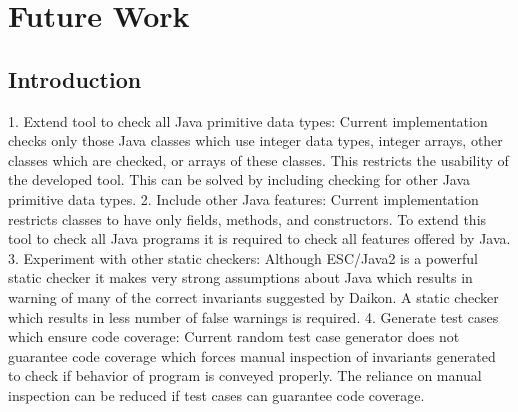 
\chapter{Future Work}
\label{chap:futureWork}

\section{Introduction}\label{sec:intro8}
	
1. Extend tool to check all Java primitive data types: Current implementation checks only those Java classes which use integer data types, integer arrays, other classes which are checked, or arrays of these classes. This restricts the usability of the developed tool. This can be solved by including checking for other Java primitive data types. 2. Include other Java features: Current implementation restricts classes to have only fields, methods, and constructors. To extend this tool to check all Java programs it is required to check all features offered by Java. 3. Experiment with other static checkers: Although ESC/Java2 is a powerful static checker it makes very strong assumptions about Java which results in warning of many of the correct invariants suggested by Daikon. A static checker which results in less number of false warnings is required. 4. Generate test cases which ensure code coverage: Current random test case generator does not guarantee code coverage which forces manual inspection of invariants generated to check if behavior of program is conveyed properly. The reliance on manual inspection can be reduced if test cases can guarantee code coverage.


